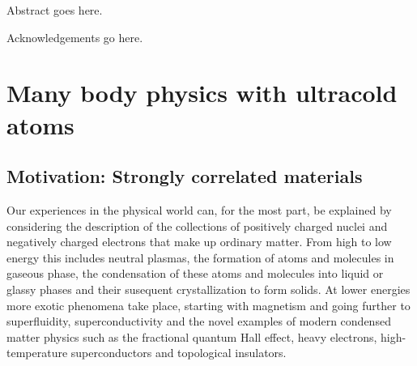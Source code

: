 \documentclass[oneside,11pt]{memoir}
\begin{document}
\pagestyle{plain}          %

\frontmatter
\thetitlepage



\riceabstract
\pagestyle{empty}  %

Abstract goes here. 

\pagestyle{plain} %

 
\riceacknowledgements

Acknowledgements go here. 


\tableofcontents*  %






\mainmatter
\pagestyle{rice}


\let\oldparskip\parskip
\setlength{\parskip}{0.8em}


\chapter{Many body physics with ultracold atoms } 

\section{ Motivation:  Strongly correlated materials }

Our experiences in the physical world can, for the most part, be explained by
considering the description of the collections of positively charged nuclei and
negatively charged electrons that make up ordinary matter.    From high to low
energy this includes neutral plasmas,  the formation of atoms and molecules in
gaseous phase, the condensation of these atoms and molecules into liquid or
glassy phases and their susequent crystallization to form solids.   At lower
energies more exotic phenomena take place, starting with magnetism and going
further to superfluidity, superconductivity and the novel examples of modern
condensed matter physics such as the fractional quantum Hall effect, heavy
electrons, high-temperature superconductors and topological insulators.
\end{document}
